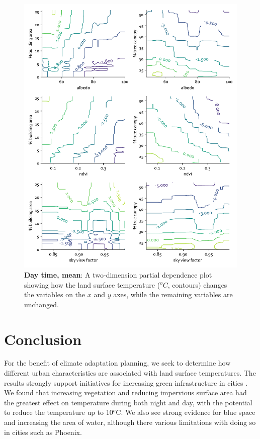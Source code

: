 \documentclass[final,3p,times,twocolumn,sort&compress]{elsarticle}
\begin{document}
\begin{figure}
    \centering
    \includegraphics[width=\linewidth]{fig/report/pdp_2d_day_500.pdf}
    \caption{
    \textbf{Day time, mean}: A two-dimension partial dependence plot showing how the land surface temperature ($^oC$, contours) changes the variables on the $x$ and $y$ axes, while the remaining variables are unchanged.
    }
    \label{fig:pdp_2dday_500}
\end{figure}


\section{Conclusion}
For the benefit of climate adaptation planning, we seek to determine how different urban characteristics are associated with land surface temperatures. 
The results strongly support initiatives for increasing green infrastructure in cities \cite{Larsen2015-da, Meerow2017-xv}. 
We found that increasing vegetation and reducing impervious surface area had the greatest effect on temperature during both night and day, with the potential to reduce the temperature up to 10$^o$C.
We also see strong evidence for blue space and increasing the area of water, although there various limitations with doing so in cities such as Phoenix.
\end{document}
